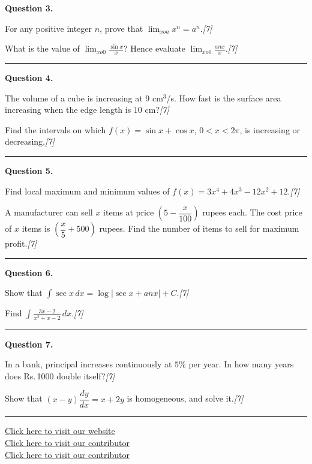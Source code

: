 \documentclass[11pt,a4paper]{article}
\newcommand{\pts}[1]{\hfill   \textit{[#1]}}
\begin{document}
\medskip


\noindent   \textbf{Question 3.}

\begin{parts}
  \item For any positive integer $n$, prove that $\displaystyle\lim_{x o a}x^n=a^n$.\pts{7}
  \item What is the value of $\displaystyle\lim_{x o0}\frac{\sin x}{x}$? Hence evaluate $\displaystyle\lim_{x o0}\frac{ an x}{x}$.\pts{7}
\end{parts}
\medskip\rule{\linewidth}{0.2pt}

\medskip


\noindent   \textbf{Question 4.}

\begin{parts}
  \item The volume of a cube is increasing at $9$ cm$^3$/s. How fast is the surface area increasing when the edge length is $10$ cm?\pts{7}
  \item Find the intervals on which $f(x)=\sin x+\cos x$, $0<x<2\pi$, is increasing or decreasing.\pts{7}
\end{parts}
\medskip\rule{\linewidth}{0.2pt}

\medskip


\noindent   \textbf{Question 5.}

\begin{parts}
  \item Find local maximum and minimum values of $f(x)=3x^4+4x^3-12x^2+12$.\pts{7}
  \item A manufacturer can sell $x$ items at price $\left(5-\dfrac{x}{100}\right)$ rupees each. The cost price of $x$ items is $\left(\dfrac{x}{5}+500\right)$ rupees. Find the number of items to sell for maximum profit.\pts{7}
\end{parts}
\medskip\rule{\linewidth}{0.2pt}

\medskip


\noindent   \textbf{Question 6.}

\begin{parts}
  \item Show that $\displaystyle\int \sec x\,dx = \log|\sec x+ an x|+C$.\pts{7}
  \item Find $\displaystyle\int \frac{3x-2}{x^2+x-2}\,dx$.\pts{7}
\end{parts}
\medskip\rule{\linewidth}{0.2pt}

\medskip


\noindent   \textbf{Question 7.}

\begin{parts}
  \item In a bank, principal increases continuously at $5\%$ per year. In how many years does Rs.\,1000 double itself?\pts{7}
  \item Show that $(x-y)\dfrac{dy}{dx}=x+2y$ is homogeneous, and solve it.\pts{7}
\end{parts}

\vfill\rule{\linewidth}{0.4pt}

\begin{center}\small
\href{https://bhu-exam.vercel.app/}{Click here to visit our website}\\[4pt]
\href{https://me-aryan.vercel.app/}{Click here to visit our contributor}\\[4pt]
\href{https://quashan-me.vercel.app/}{Click here to visit our contributor}
\end{center}
\end{document}

